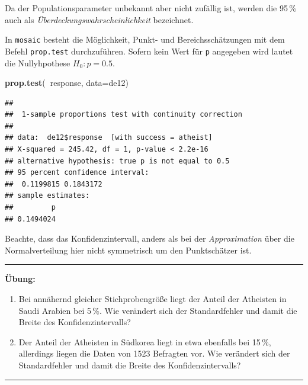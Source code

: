 \documentclass[12pt,ngerman,paper=a4,pagesize,DIV=13]{scrreprt}
\newenvironment{Shaded}{\begin{snugshade}}{\end{snugshade}}
\newcommand{\DataTypeTok}[1]{\textcolor[rgb]{0.13,0.29,0.53}{#1}}
\newcommand{\KeywordTok}[1]{\textcolor[rgb]{0.13,0.29,0.53}{\textbf{#1}}}
\newcommand{\NormalTok}[1]{#1}
\newcommand{\OperatorTok}[1]{\textcolor[rgb]{0.81,0.36,0.00}{\textbf{#1}}}
\providecommand{\tightlist}{%
  \setlength{\itemsep}{0pt}\setlength{\parskip}{0pt}}
\begin{document}
Da der Populationsparameter unbekannt aber nicht zufällig ist, werden
die 95\(\,\)\% auch als \emph{Überdeckungswahrscheinlichkeit}
bezeichnet.

In \texttt{mosaic} besteht die Möglichkeit, Punkt- und
Bereichsschätzungen mit dem Befehl \texttt{prop.test} durchzuführen.
Sofern kein Wert für \texttt{p} angegeben wird lautet die Nullyhpothese
\(H_0: p=0.5\).

\begin{Shaded}
\begin{Highlighting}[]
\KeywordTok{prop.test}\NormalTok{(}\OperatorTok{~}\NormalTok{response, }\DataTypeTok{data=}\NormalTok{de12)}
\end{Highlighting}
\end{Shaded}

\begin{verbatim}
## 
##  1-sample proportions test with continuity correction
## 
## data:  de12$response  [with success = atheist]
## X-squared = 245.42, df = 1, p-value < 2.2e-16
## alternative hypothesis: true p is not equal to 0.5
## 95 percent confidence interval:
##  0.1199815 0.1843172
## sample estimates:
##         p 
## 0.1494024
\end{verbatim}

Beachte, dass das Konfidenzintervall, anders als bei der
\emph{Approximation} über die Normalverteilung hier nicht symmetrisch um
den Punktschätzer ist.

\begin{center}\rule{0.5\linewidth}{\linethickness}\end{center}

\textbf{Übung:}

\begin{enumerate}
\def\labelenumi{\arabic{enumi}.}
\setcounter{enumi}{2}
\tightlist
\item
  Bei annähernd gleicher Stichprobengröße liegt der Anteil der Atheisten
  in Saudi Arabien bei 5\(\,\)\%. Wie verändert sich der Standardfehler
  und damit die Breite des Konfidenzintervalls?
\item
  Der Anteil der Atheisten in Südkorea liegt in etwa ebenfalls bei
  15\(\,\)\%, allerdings liegen die Daten von 1523 Befragten vor. Wie
  verändert sich der Standardfehler und damit die Breite des
  Konfidenzintervalls?
\end{enumerate}

\begin{center}\rule{0.5\linewidth}{\linethickness}\end{center}
\end{document}
